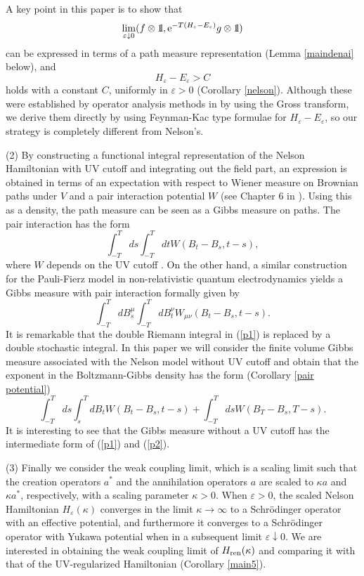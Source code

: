\documentclass[11pt]{article}
\def\bbbone{{\mathchoice {\rm 1\mskip-4mu l} {\rm 1\mskip-4mu l}
{\rm 1\mskip-4.5mu l} {\rm 1\mskip-5mu l}}}
\def\one{\bbbone}
\providecommand{\eq}[1]{\begin{equation}\label{#1}}
\providecommand{\en}{\end{equation}}
\providecommand{\kak}[1]{(\ref{#1})}
\providecommand{\hni}{\hn_\ren }
\providecommand{\hn}{H}%
\providecommand{\add}{a^\ast}
\providecommand{\e}{{\rm e}}
\providecommand{\1}{\mathbb{1}}
\providecommand{\eps}{\varepsilon}
\providecommand{\ren}{{\rm ren}}
\newcounter {constant}
\begin{document}
A key point in this paper is to show that
\eq{DD}
\lim_{\eps\downarrow0}
(f\otimes\one, \e^{-T(H_\eps-E_\eps)}g\otimes \one)
\en
can be expressed in terms of a path measure representation
(Lemma \ref{maindenai} below), and
\eq{CC}
H_\eps-E_\eps>C
\en
holds with a constant $C$, uniformly in $\eps>0$ (Corollary \ref{nelson}). Although these were established by
operator analysis methods in \cite{nel64} by using the Gross transform, we derive them directly by using
Feynman-Kac type formulae for $H_\eps-E_\eps$, so our strategy is completely different from Nelson's.

\medskip
\noindent
(2)
By constructing a functional integral representation of the Nelson Hamiltonian with UV cutoff and integrating out
the field part, an expression is obtained in terms of an expectation with respect to Wiener measure on Brownian
paths under $V$ and a pair interaction potential $W$ (see Chapter 6 in \cite{lhb11}). Using this as a density,
the path measure can be seen as a Gibbs measure on paths. The pair interaction has the form
\eq{p1}
\int_{-T}^ T ds \int_{-T}^ T dt W(B_t-B_s,t-s),
\en
where $W$ depends on the UV cutoff \cite{bhlms02}. On the other hand, a similar construction for the Pauli-Fierz
model in non-relativistic quantum electrodynamics yields a Gibbs measure with pair interaction formally given by
\cite{spo87,bh09}
\eq{p2}
\int_{-T}^ T dB_s^\mu  \int_{-T}^ T dB_t^\nu  W_{\mu\nu}(B_t-B_s,t-s).
\en
It is remarkable that the double Riemann integral in \kak{p1} is replaced by a double stochastic integral.
In this paper we will consider the finite volume Gibbs measure associated with the Nelson model without UV
cutoff and obtain that the exponent in the Boltzmann-Gibbs density has the form
(Corollary \ref{pair potential})
\eq{p3}
\int_{-T}^ T ds \int_{s}^ T dB_t  W(B_t-B_s,t-s) +\int _{-T}^T ds W(B_T-B_s,T-s).
\en
It is interesting to see that the Gibbs measure without a UV cutoff has the intermediate form of \kak{p1} and
\kak{p2}.


\medskip
\noindent
(3)
Finally we consider the weak coupling limit, which  is a scaling limit such that the creation operators $\add$
and the annihilation operators $a$ are scaled to $\kappa a$ and $\kappa \add$, respectively, with a scaling
parameter $\kappa>0$. When $\eps>0$, the scaled Nelson Hamiltonian $\hn_\eps(\kappa)$ converges in the limit
$\kappa \to \infty$ to a Schr\"odinger operator with an effective potential, and furthermore it converges to
a Schr\"odinger operator with Yukawa potential when in a subsequent limit $\eps\downarrow 0$. We are interested
in obtaining the weak coupling limit of $\hni(\kappa)$ and comparing it with that of the UV-regularized
Hamiltonian (Corollary \ref{main5}).
\end{document}
